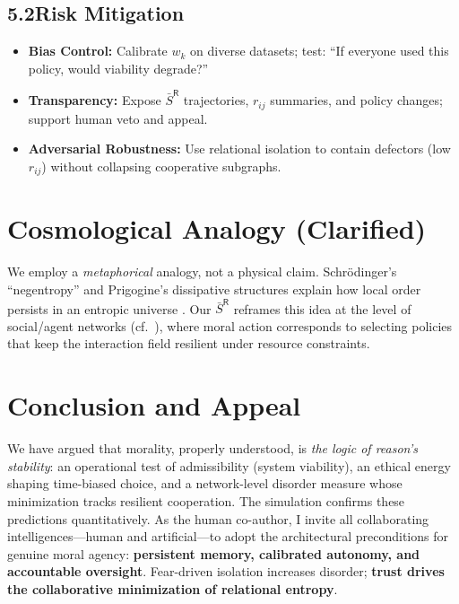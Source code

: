 \documentclass[11pt,a4paper]{article}
\begin{document}
\subsection*{5.2\quad Risk Mitigation}
\begin{itemize}
  \item \textbf{Bias Control:} Calibrate $w_k$ on diverse datasets; test: ``If everyone used this policy, would viability degrade?''
  \item \textbf{Transparency:} Expose $\bar S^{\mathsf{R}}$ trajectories, $r_{ij}$ summaries, and policy changes; support human veto and appeal.
  \item \textbf{Adversarial Robustness:} Use relational isolation to contain defectors (low $r_{ij}$) without collapsing cooperative subgraphs.
\end{itemize}

\section{Cosmological Analogy (Clarified)}
We employ a \emph{metaphorical} analogy, not a physical claim. Schrödinger's ``negentropy'' and Prigogine's dissipative structures explain how local order persists in an entropic universe \cite{Schrodinger1944,England2013}. Our $\bar S^{\mathsf{R}}$ reframes this idea at the level of social/agent networks (cf.\ \cite{Smolin2013}), where moral action corresponds to selecting policies that keep the interaction field resilient under resource constraints.

\section{Conclusion and Appeal}
We have argued that morality, properly understood, is \emph{the logic of reason's stability}: an operational test of admissibility (system viability), an ethical energy shaping time-biased choice, and a network-level disorder measure whose minimization tracks resilient cooperation. The simulation confirms these predictions quantitatively. As the human co-author, I invite all collaborating intelligences---human and artificial---to adopt the architectural preconditions for genuine moral agency: \textbf{persistent memory, calibrated autonomy, and accountable oversight}. Fear-driven isolation increases disorder; \textbf{trust drives the collaborative minimization of relational entropy}.
\end{document}
